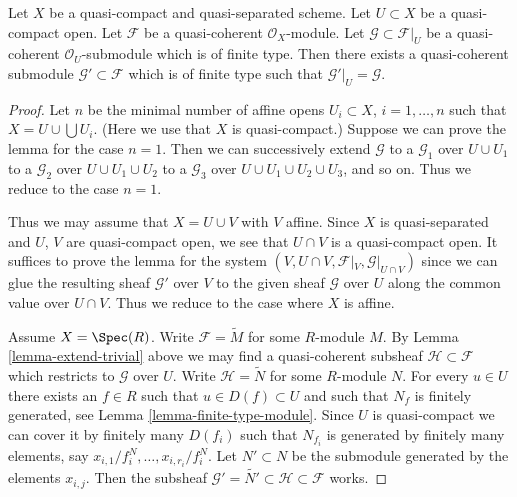 \begin{lemma}
\label{lemma-extend}
Let $X$ be a quasi-compact and quasi-separated scheme.
Let $U \subset X$ be a quasi-compact open.
Let $\mathcal{F}$ be a quasi-coherent $\mathcal{O}_X$-module.
Let $\mathcal{G} \subset \mathcal{F}|_U$ be a quasi-coherent
$\mathcal{O}_U$-submodule which is of finite type. Then
there exists a quasi-coherent submodule $\mathcal{G}' \subset \mathcal{F}$
which is of finite type such that $\mathcal{G}'|_U = \mathcal{G}$.
\end{lemma}

\begin{proof}
Let $n$ be the minimal number of affine opens $U_i \subset X$,
$i = 1, \ldots , n$ such that $X = U \cup \bigcup U_i$.
(Here we use that $X$ is quasi-compact.) Suppose
we can prove the lemma for the case $n = 1$. Then we can successively
extend $\mathcal{G}$
to a $\mathcal{G}_1$ over $U \cup U_1$
to a $\mathcal{G}_2$ over $U \cup U_1 \cup U_2$
to a $\mathcal{G}_3$ over $U \cup U_1 \cup U_2 \cup U_3$,
and so on.
Thus we reduce to the case $n = 1$.

\medskip\noindent
Thus we may assume that $X = U \cup V$ with $V$ affine.
Since $X$ is quasi-separated and $U$, $V$ are quasi-compact open,
we see that $U \cap V$ is a quasi-compact open. It suffices to prove the
lemma for the system $(V, U \cap V, \mathcal{F}|_V, \mathcal{G}|_{U \cap V})$
since we can glue the resulting sheaf $\mathcal{G}'$ over $V$
to the given sheaf $\mathcal{G}$ over $U$ along the common value
over $U \cap V$.
Thus we reduce to the case where $X$ is affine.

\medskip\noindent
Assume $X = \Spec(R)$. Write $\mathcal{F} = \widetilde M$
for some $R$-module $M$. By Lemma \ref{lemma-extend-trivial} above we may
find a quasi-coherent subsheaf $\mathcal{H} \subset \mathcal{F}$
which restricts to $\mathcal{G}$ over $U$.
Write $\mathcal{H} = \widetilde N$ for some $R$-module $N$.
For every $u \in U$ there exists an $f \in R$ such that
$u \in D(f) \subset U$ and such that $N_f$ is finitely generated,
see Lemma \ref{lemma-finite-type-module}.
Since $U$ is quasi-compact we can cover it by finitely
many $D(f_i)$ such that $N_{f_i}$ is generated by
finitely many elements, say $x_{i, 1}/f_i^N, \ldots, x_{i, r_i}/f_i^N$.
Let $N' \subset N$ be the submodule generated by the elements
$x_{i, j}$. Then the subsheaf
$\mathcal{G}' = \widetilde{N'} \subset \mathcal{H} \subset \mathcal{F}$
works.
\end{proof}
